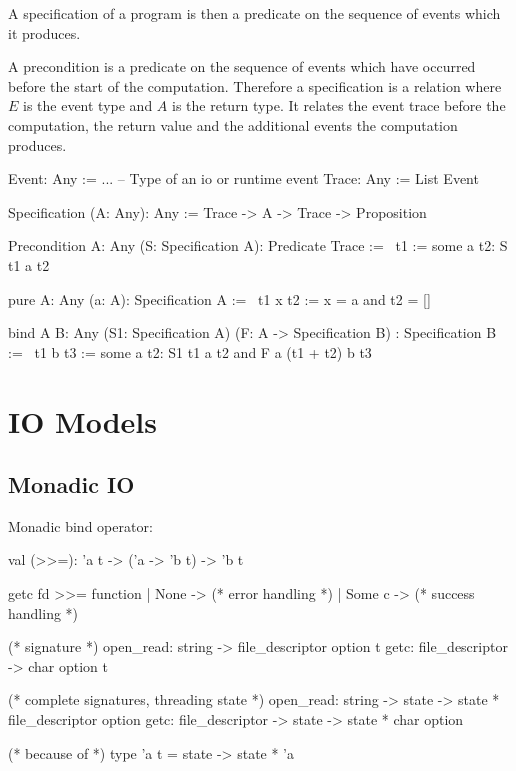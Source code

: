 A specification of a program is then a predicate on the sequence of events which
it produces.

A precondition is a predicate on the sequence of events which have occurred
before the start of the computation. Therefore a specification is a relation
 where $E$ is the event type and $A$
is the return type. It relates the event trace before the computation, the
return value and the additional events the computation produces.

\begin{alba}
    Event: Any := ...      -- Type of an io or runtime event
    Trace: Any := List Event

    Specification (A: Any): Any :=
        Trace -> A -> Trace -> Proposition


    Precondition {A: Any} (S: Specification A): Predicate Trace
    :=
        \ t1 := some a t2: S t1 a t2


    pure {A: Any} (a: A): Specification A :=
        \ t1 x t2 :=
            x = a and t2 = []


    bind {A B: Any} (S1: Specification A) (F: A -> Specification B)
    : Specification B
    :=
        \ t1 b t3  :=
            some a t2: S1 t1 a t2 and F a (t1 + t2) b t3
\end{alba}



\section{IO Models}



\subsection{Monadic IO}

\noindent Monadic bind operator:
\begin{ocaml}
  val (>>=): 'a t -> ('a -> 'b t) -> 'b t
\end{ocaml}


\begin{ocaml}
  getc fd >>= function
  | None ->
    (* error handling *)
  | Some c ->
    (* success handling *)

  (* signature *)
  open_read: string -> file_descriptor option t
  getc: file_descriptor -> char option t

  (* complete signatures, threading state *)
  open_read: string -> state -> state * file_descriptor option
  getc: file_descriptor -> state -> state * char option

  (* because of *)
  type 'a t = state -> state * 'a
\end{ocaml}
%

